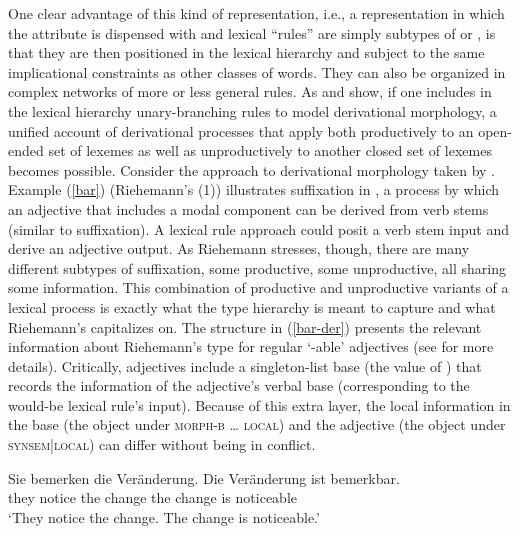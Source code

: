 \documentclass[output=paper,biblatex,babelshorthands,newtxmath,draftmode,colorlinks,citecolor=brown]{langscibook}
\begin{document}
One clear advantage of this kind of representation, i.e., a representation in which the attribute
 is dispensed with and lexical ``rules'' are simply subtypes of  or
, is that they are then positioned in the lexical hierarchy and subject to the
same implicational constraints as other classes of words.  They can also be organized in complex
networks of more or less general rules.  As \citet{Riehemann1998} and \citet{Koenig1999c} show, if
one includes in the lexical hierarchy unary-branching rules to model derivational morphology, a
unified account of derivational processes that apply both productively to an open-ended set of
lexemes as well as unproductively to another closed set of lexemes becomes possible.  Consider the
approach to derivational morphology taken by \citet{Riehemann1998}. Example
(\ref{bar}) (Riehemann's (1)) illustrates  suffixation in
, a process by which an adjective that includes a modal component can be derived from
verb stems (similar to   suffixation).  A lexical rule approach could posit
a verb stem input and derive an adjective output.  As Riehemann stresses, though, there are many
different subtypes of  suffixation, some productive, some unproductive, all sharing some
information.  This combination of productive and unproductive variants of a lexical process is
exactly what the type hierarchy is meant to capture and what Riehemann's  capitalizes on.  The structure in (\ref{bar-der}) presents the relevant
information about Riehemann's type for regular  `-able' adjectives (see
\citealt[68]{Riehemann1998} for more details).  Critically,  adjectives include a
singleton-list base (the value of ) that records the information of the adjective's
verbal base (corresponding to the would-be lexical rule's input).  Because of this extra layer, the
local information in the base (the  object under \textsc{morph-b} \ldots{}
\textsc{local}) and the  adjective (the  object under \textsc{synsem|local})
can differ without being in conflict.

\largerpage
\ea
\label{bar}
\gll Sie  bemerken die Veränderung. Die Veränderung ist bemerkbar. \\
     they notice   the change       the change      is  noticeable \\
\glt `They notice the change. The change is noticeable.'
\z
\end{document}

